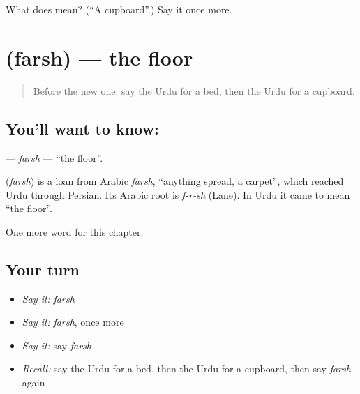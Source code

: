 \begin{tcolorbox}[breakable,colback=teal!4,colframe=teal!35!black,title={Before you move on}]
What does  mean? (\textquotedblleft{}A cupboard\textquotedblright{}.) Say it once more.
\end{tcolorbox}
\section[\texorpdfstring{\ur{فرش} (farsh)}{فرش (farsh)}]{ (farsh) — the floor}

\label{lesson:UR-C59-farsh}



\begin{quote}
Before the new one: say the Urdu for a bed, then the Urdu for a cupboard.
\end{quote}

\subsection*{You'll want to know: }
\textbf{} — \emph{farsh} — \textquotedblleft{}the floor\textquotedblright{}.

\begin{cousinweb}
\textbf{} (\emph{farsh}) is a loan from Arabic \emph{farsh}, \textquotedblleft{}anything spread, a carpet\textquotedblright{}, which reached Urdu through Persian. Its Arabic root is \emph{f-r-sh} (Lane). In Urdu it came to mean \textquotedblleft{}the floor\textquotedblright{}.
\end{cousinweb}

\begin{grammarlens}[title={What you've built}]
One more word for this chapter.
\end{grammarlens}

\subsection*{Your turn}
\begin{itemize}
\raggedright
  \item \emph{Say it:} \emph{farsh}
  \item \emph{Say it:} \emph{farsh}, once more
  \item \emph{Say it:} say \emph{farsh}
  \item \emph{Recall:} say the Urdu for a bed, then the Urdu for a cupboard, then say \emph{farsh} again
\end{itemize}

